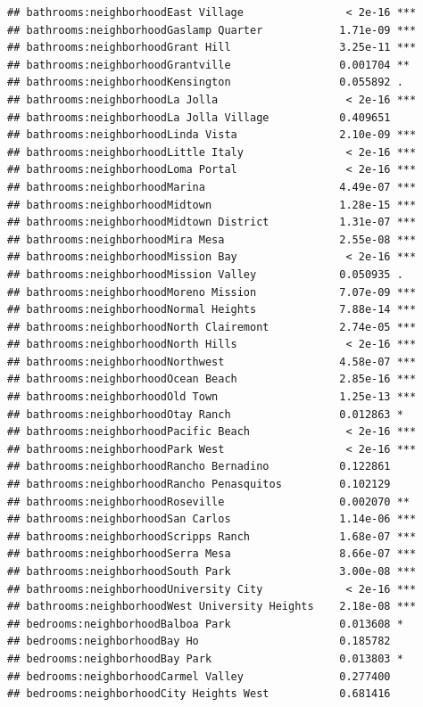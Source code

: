 \documentclass[
]{book}
\begin{document}
\begin{verbatim}
## bathrooms:neighborhoodEast Village                < 2e-16 ***
## bathrooms:neighborhoodGaslamp Quarter            1.71e-09 ***
## bathrooms:neighborhoodGrant Hill                 3.25e-11 ***
## bathrooms:neighborhoodGrantville                 0.001704 ** 
## bathrooms:neighborhoodKensington                 0.055892 .  
## bathrooms:neighborhoodLa Jolla                    < 2e-16 ***
## bathrooms:neighborhoodLa Jolla Village           0.409651    
## bathrooms:neighborhoodLinda Vista                2.10e-09 ***
## bathrooms:neighborhoodLittle Italy                < 2e-16 ***
## bathrooms:neighborhoodLoma Portal                 < 2e-16 ***
## bathrooms:neighborhoodMarina                     4.49e-07 ***
## bathrooms:neighborhoodMidtown                    1.28e-15 ***
## bathrooms:neighborhoodMidtown District           1.31e-07 ***
## bathrooms:neighborhoodMira Mesa                  2.55e-08 ***
## bathrooms:neighborhoodMission Bay                 < 2e-16 ***
## bathrooms:neighborhoodMission Valley             0.050935 .  
## bathrooms:neighborhoodMoreno Mission             7.07e-09 ***
## bathrooms:neighborhoodNormal Heights             7.88e-14 ***
## bathrooms:neighborhoodNorth Clairemont           2.74e-05 ***
## bathrooms:neighborhoodNorth Hills                 < 2e-16 ***
## bathrooms:neighborhoodNorthwest                  4.58e-07 ***
## bathrooms:neighborhoodOcean Beach                2.85e-16 ***
## bathrooms:neighborhoodOld Town                   1.25e-13 ***
## bathrooms:neighborhoodOtay Ranch                 0.012863 *  
## bathrooms:neighborhoodPacific Beach               < 2e-16 ***
## bathrooms:neighborhoodPark West                   < 2e-16 ***
## bathrooms:neighborhoodRancho Bernadino           0.122861    
## bathrooms:neighborhoodRancho Penasquitos         0.102129    
## bathrooms:neighborhoodRoseville                  0.002070 ** 
## bathrooms:neighborhoodSan Carlos                 1.14e-06 ***
## bathrooms:neighborhoodScripps Ranch              1.68e-07 ***
## bathrooms:neighborhoodSerra Mesa                 8.66e-07 ***
## bathrooms:neighborhoodSouth Park                 3.00e-08 ***
## bathrooms:neighborhoodUniversity City             < 2e-16 ***
## bathrooms:neighborhoodWest University Heights    2.18e-08 ***
## bedrooms:neighborhoodBalboa Park                 0.013608 *  
## bedrooms:neighborhoodBay Ho                      0.185782    
## bedrooms:neighborhoodBay Park                    0.013803 *  
## bedrooms:neighborhoodCarmel Valley               0.277400    
## bedrooms:neighborhoodCity Heights West           0.681416    

\end{verbatim}
\end{document}
